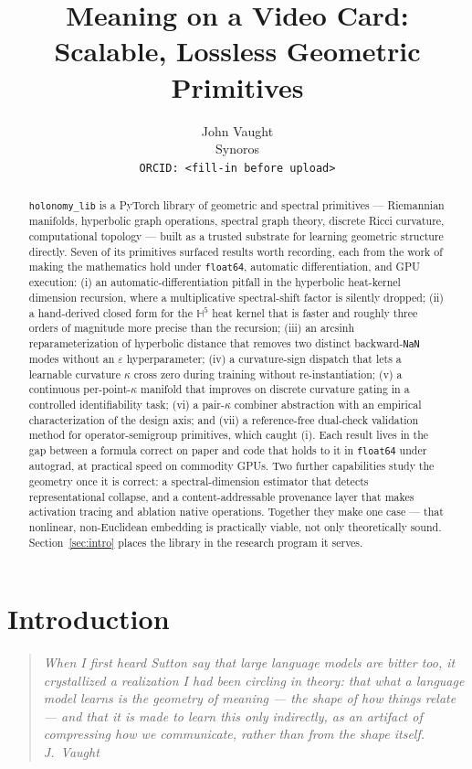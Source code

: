 \documentclass{article}
\title{Meaning on a Video Card:\\ Scalable, Lossless Geometric Primitives}
\author{%
  John Vaught \\
  Synoros \\
  \texttt{ORCID: <fill-in before upload>}%
}
\newcommand{\Hyp}{\mathbb{H}}
\newcommand{\kp}{\kappa}
\newcommand{\code}[1]{\texttt{#1}}
\begin{document}
\maketitle

\begin{abstract}
\code{holonomy\_lib} is a PyTorch library of geometric and spectral
primitives --- Riemannian manifolds, hyperbolic graph operations,
spectral graph theory, discrete Ricci curvature, computational topology
--- built as a trusted substrate for learning geometric structure
directly. Seven of its primitives surfaced results worth recording, each
from the work of making the mathematics hold under \code{float64},
automatic differentiation, and GPU execution: (i) an
automatic-differentiation pitfall in the hyperbolic
heat-kernel dimension recursion, where a multiplicative spectral-shift
factor is silently dropped; (ii) a hand-derived closed form for the
$\Hyp^5$ heat kernel that is faster and roughly three orders of
magnitude more precise than the recursion; (iii) an arcsinh
reparameterization of hyperbolic distance that removes two distinct
backward-\code{NaN} modes without an $\varepsilon$ hyperparameter;
(iv) a curvature-sign dispatch that lets a learnable curvature $\kp$
cross zero during training without re-instantiation; (v) a continuous
per-point-$\kp$ manifold that improves on discrete curvature gating in a
controlled identifiability task; (vi) a pair-$\kp$ combiner abstraction
with an empirical characterization of the design axis; and (vii) a
reference-free dual-check validation method for operator-semigroup
primitives, which caught (i). Each result lives in the gap between a
formula correct on paper and code that holds to it in \code{float64}
under autograd, at practical speed on commodity GPUs. Two further
capabilities study the geometry once it is correct: a spectral-dimension
estimator that detects representational collapse, and a
content-addressable provenance layer that makes activation tracing and
ablation native operations. Together they make one case --- that
nonlinear, non-Euclidean embedding is practically viable, not only
theoretically sound. Section~\ref{sec:intro} places the library in the
research program it serves.
\end{abstract}

\section{Introduction}
\label{sec:intro}

\begin{quote}
\itshape
When I first heard Sutton say that large language models are bitter too,
it crystallized a realization I had been circling in theory: that what a
language model learns is the geometry of meaning --- the shape of how
things relate --- and that it is made to learn this only indirectly, as
an artifact of compressing how we communicate, rather than from the shape
itself. \upshape\textemdash\,J.~Vaught
\end{quote}
\end{document}
